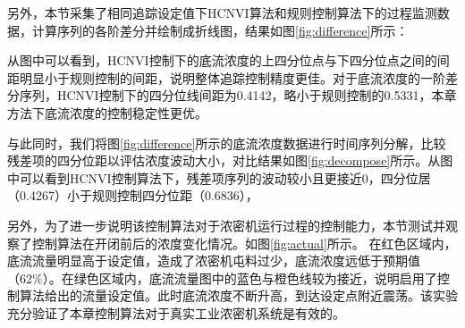 另外，本节采集了相同追踪设定值下HCNVI算法和规则控制算法下的过程监测数据，计算序列的各阶差分并绘制成折线图，结果如图\ref{fig:difference}所示：

从图中可以看到，HCNVI控制下的底流浓度的上四分位点与下四分位点之间的间距明显小于规则控制的间距，说明整体追踪控制精度更佳。对于底流浓度的一阶差分序列，HCNVI控制下的四分位线间距为0.4142，略小于规则控制的0.5331，本章方法下底流浓度的控制稳定性更优。

与此同时，我们将图\ref{fig:difference}所示的底流浓度数据进行时间序列分解，比较残差项的四分位距以评估浓度波动大小，对比结果如图\ref{fig:decompose}所示。从图中可以看到HCNVI控制算法下，残差项序列的波动较小且更接近0，四分位居（0.4267）小于规则控制四分位距（0.6836），


另外，为了进一步说明该控制算法对于浓密机运行过程的控制能力，本节测试并观察了控制算法在开闭前后的浓度变化情况。如图\ref{fig:actual}所示。
在红色区域内，底流流量明显高于设定值，造成了浓密机屯料过少，底流浓度远低于预期值（62\%）。在绿色区域内，底流流量图中的蓝色与橙色线较为接近，说明启用了控制算法给出的流量设定值。此时底流浓度不断升高，到达设定点附近震荡。该实验充分验证了本章控制算法对于真实工业浓密机系统是有效的。












